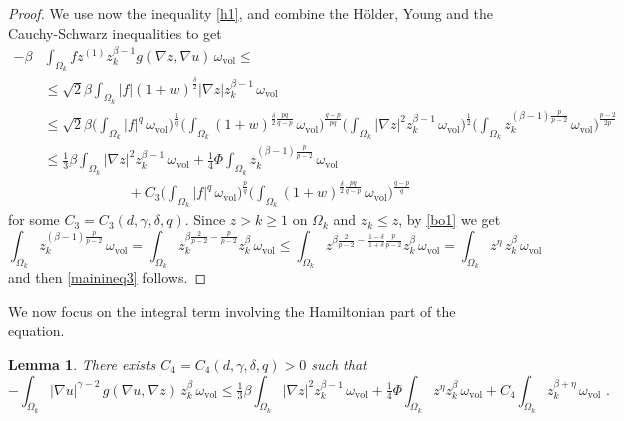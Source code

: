 \documentclass[10pt, a4paper, reqno, oneside]{amsart}
\theoremstyle{plain}
\theoremstyle{definition}
\theoremstyle{plain}
\newtheorem{lemma}[theo]{Lemma}
\theoremstyle{definition}
\theoremstyle{plain}
\renewcommand{\=}{:=}
\begin{document}
\begin{proof}
We use now the inequality \eqref{h1}, and combine the H\"older, Young and the Cauchy-Schwarz inequalities to get
$$\begin{aligned}
-\beta &\int_{\Omega_k} f z^{(1)}z_k^{\beta-1}g(\nabla z,\nabla u)\, \omega_{\mathrm{vol}} \leq \\
&\leq \sqrt{2}\beta \int_{\Omega_k} |f| (1+w)^{\frac{\delta}2}|\nabla z| z_k^{\beta-1} \, \omega_{\mathrm{vol}} \\
& \leq \sqrt{2}\beta
\bigg(\int_{\Omega_k} |f|^q \, \omega_{\mathrm{vol}}\bigg)^{\frac1q}
\bigg(\int_{\Omega_k} (1+w)^{\frac{\delta}2\frac{pq}{q-p}} \, \omega_{\mathrm{vol}}\bigg)^{\frac{q-p}{pq}}
\bigg(\int_{\Omega_k} |\nabla z|^2z_k^{\beta-1} \, \omega_{\mathrm{vol}}\bigg)^{\frac12}
\bigg(\int_{\Omega_k} z_k^{(\beta-1)\frac{p}{p-2}} \, \omega_{\mathrm{vol}}\bigg)^{\frac{p-2}{2p}} \\
& \leq \tfrac13\beta \int_{\Omega_k} |\nabla z|^2z_k^{\beta-1} \, \omega_{\mathrm{vol}}
+\tfrac14\Phi \int_{\Omega_k} z_k^{(\beta-1)\frac{p}{p-2}} \, \omega_{\mathrm{vol}} \\
& \qquad\qquad\qquad +C_3 \bigg(\int_{\Omega_k} |f|^q \, \omega_{\mathrm{vol}}\bigg)^{\frac{p}q}
\bigg(\int_{\Omega_k} (1+w)^{\frac{\delta}2\frac{pq}{q-p}} \, \omega_{\mathrm{vol}}\bigg)^{\frac{q-p}{q}}
\end{aligned}$$
for some $C_3 = C_3(d,\gamma,\delta,q)$. Since $z> k \geq1$ on $\Omega_k$ and $z_k \leq z$, by \eqref{bo1} we get
$$
\int_{\Omega_k} z_k^{(\beta-1)\frac{p}{p-2}}\, \omega_{\mathrm{vol}} = 
\int_{\Omega_k} z_k^{\beta\frac{2}{p-2}-\frac{p}{p-2}} z_k^\beta\, \omega_{\mathrm{vol}}
\leq \int_{\Omega_k}z^{\beta\frac{2}{p-2}-\frac{1-\delta}{1+\delta}\frac{p}{p-2}}z_k^\beta\, \omega_{\mathrm{vol}} = \int_{\Omega_k}z^{\eta}\,z_k^\beta\, \omega_{\mathrm{vol}}
$$
and then \eqref{mainineq3} follows.
\end{proof}

We now focus on the integral term involving the Hamiltonian part of the equation.
\begin{lemma}
There exists $C_4 = C_4(d,\gamma,\delta,q)>0$ such that
\begin{equation} \label{mainineq4}
-\int_{\Omega_k} |\nabla u|^{\gamma-2} \, g(\nabla u,\nabla z) \, z_k^{\beta} \, \omega_{\mathrm{vol}} \leq
\tfrac13\beta \int_{\Omega_k} |\nabla z|^2z_k^{\beta-1} \, \omega_{\mathrm{vol}} 
+\tfrac14\Phi \int_{\Omega_k} z^{\eta}z_k^{\beta}\, \omega_{\mathrm{vol}}
+ C_4\int_{\Omega_k}z_k^{\beta+\eta}\, \omega_{\mathrm{vol}} \,\, .
\end{equation}
\end{lemma}
\end{document}
